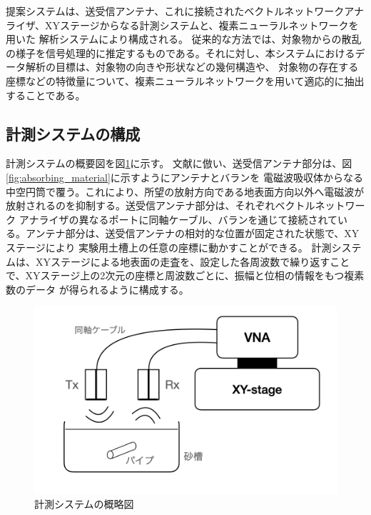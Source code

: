 \documentclass[11pt,a4paper,uplatex,draft]{ujarticle}
\begin{document}
    提案システムは、送受信アンテナ、これに接続されたベクトルネットワークアナライザ、XYステージからなる計測システムと、複素ニューラルネットワークを用いた
    解析システムにより構成される。
    従来的な方法では、対象物からの散乱の様子を信号処理的に推定するものである。それに対し、本システムにおけるデータ解析の目標は、対象物の向きや形状などの幾何構造や、
    対象物の存在する座標などの特徴量について、複素ニューラルネットワークを用いて適応的に抽出することである。

  \subsection{計測システムの構成}

    計測システムの概要図を図\ref{fig:XYstage_configuration}に示す。
    文献\cite{absorbing_material}に倣い、送受信アンテナ部分は、図\ref{fig:absorbing_material}に示すようにアンテナとバランを
    電磁波吸収体からなる中空円筒で覆う。これにより、所望の放射方向である地表面方向以外へ電磁波が放射されるのを抑制する。送受信アンテナ部分は、それぞれベクトルネットワーク
    アナライザの異なるポートに同軸ケーブル、バランを通じて接続されている。アンテナ部分は、送受信アンテナの相対的な位置が固定された状態で、XYステージにより
    実験用土槽上の任意の座標に動かすことができる。
    計測システムは、XYステージによる地表面の走査を、設定した各周波数で繰り返すことで、XYステージ上の2次元の座標と周波数ごとに、振幅と位相の情報をもつ複素数のデータ
    が得られるように構成する。

    \begin{figure}[hbtp]
      \centering
      \includegraphics[keepaspectratio, width=130mm]{Images/XYstage_configuration.png}
      \caption{計測システムの概略図}\label{fig:XYstage_configuration}
    \end{figure}
\end{document}

